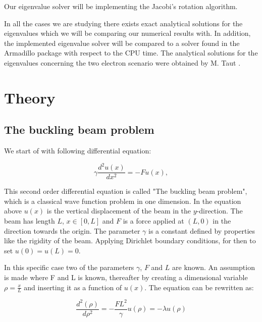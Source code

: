 \documentclass[twoside,onecolumn]{article}
\begin{document}

Our eigenvalue solver will be implementing the Jacobi's rotation algorithm.


\bigskip

In all the cases we are studying there exists exact analytical solutions for the eigenvalues which we will be comparing our numerical results with. In addition, the implemented eigenvalue solver will be compared to a solver found in the Armadillo\cite{Sanderson2019}\cite{Saddler1971} package with respect to the CPU time. The analytical solutions for the eigenvalues concerning the two electron scenario were obtained by M. Taut \cite{taut}.  

\section{Theory}

\subsection{The buckling beam problem}
We start of with following differential equation: 

\begin{equation*}
\gamma \frac{d^2 u(x)}{dx^2} = -F u(x),
\end{equation*}

\bigskip

This second order differential equation is called "The buckling beam problem", which is a classical wave function problem in one dimension. In the equation above $u(x)$ is the vertical displacement of the beam in the $y$-direction. The beam has length $L$, $x\in [0,L]$ and $F$ is a force applied at $(L,0)$ in the direction towards the origin. The parameter $\gamma$ is a constant defined by properties like the rigidity of the beam. Applying Dirichlet boundary conditions, for then to set $u(0)=u(L)=0$.

\bigskip

In this specific case two of the  parameters $\gamma$, $F$ and $L$ are known. An assumption is made where F and L is known, thereafter by creating a dimensional variable $\rho = \frac{x}{L}$ and inserting it as a function of $u(x)$. The equation can be rewritten as: 

\bigskip

\begin{equation}
 \frac{d^2(\rho)}{d\rho^2} = -\frac{FL^2}{\gamma} u(\rho)=-\lambda u(\rho)
\end{equation}
\end{document}
